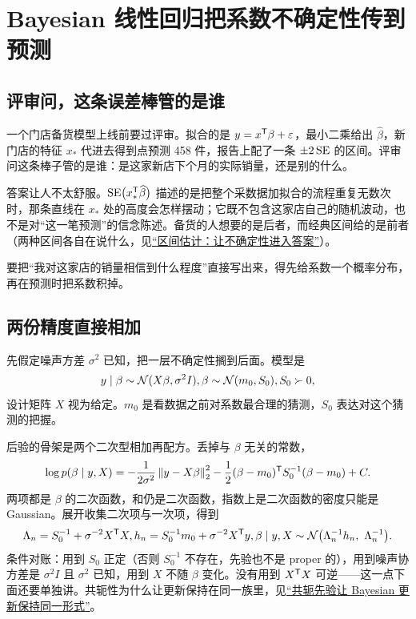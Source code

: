 \section{Bayesian 线性回归把系数不确定性传到预测}
\label{sec:13-Machine-Learning/02-Linear-Models/04}

\subsection{评审问，这条误差棒管的是谁}

一个门店备货模型上线前要过评审。拟合的是 \(y=x^{\mathsf{T}}\beta+\varepsilon\)，最小二乘给出 \(\widehat\beta\)，新门店的特征 \(x_*\) 代进去得到点预测 458 件，报告上配了一条 \(\pm 2\operatorname{SE}\) 的区间。评审问这条棒子管的是谁：是这家新店下个月的实际销量，还是别的什么。

答案让人不太舒服。\(\operatorname{SE}\bigl(x_*^{\mathsf{T}}\widehat\beta\bigr)\) 描述的是把整个采数据加拟合的流程重复无数次时，那条直线在 \(x_*\) 处的高度会怎样摆动；它既不包含这家店自己的随机波动，也不是对``这一笔预测''的信念陈述。备货的人想要的是后者，而经典区间给的是前者（两种区间各自在说什么，见\hyperref[ch:089]{``区间估计：让不确定性进入答案''}）。

要把``我对这家店的销量相信到什么程度''直接写出来，得先给系数一个概率分布，再在预测时把系数积掉。

\subsection{两份精度直接相加}

先假定噪声方差 \(\sigma^2\) 已知，把一层不确定性搁到后面。模型是
\[
y\mid\beta\sim\mathcal N(X\beta,\sigma^2I),
\space
\beta\sim\mathcal N(m_0,S_0),\space S_0\succ 0,
\]
设计矩阵 \(X\) 视为给定。\(m_0\) 是看数据之前对系数最合理的猜测，\(S_0\) 表达对这个猜测的把握。

后验的骨架是两个二次型相加再配方。丢掉与 \(\beta\) 无关的常数，
\[
\log p(\beta\mid y,X)=-\frac{1}{2\sigma^2}\left\lVert y-X\beta\right\rVert_2^2-\frac12(\beta-m_0)^{\mathsf{T}}S_0^{-1}(\beta-m_0)+C .
\]
两项都是 \(\beta\) 的二次函数，和仍是二次函数，指数上是二次函数的密度只能是 Gaussian。展开收集二次项与一次项，得到
\[
\Lambda_n=S_0^{-1}+\sigma^{-2}X^{\trans}X,\qquad
h_n=S_0^{-1}m_0+\sigma^{-2}X^{\trans}y,\qquad
\beta\given y,X\sim\mathcal N\bigl(\Lambda_n^{-1}h_n,\ \Lambda_n^{-1}\bigr).
\]
条件对账：用到 \(S_0\) 正定（否则 \(S_0^{-1}\) 不存在，先验也不是 proper 的），用到噪声协方差是 \(\sigma^2I\) 且 \(\sigma^2\) 已知，用到 \(X\) 不随 \(\beta\) 变化。没有用到 \(X^{\mathsf{T}}X\) 可逆——这一点下面还要单独讲。共轭性为什么让更新保持在同一族里，见\hyperref[sec:13-Machine-Learning/06-Probabilistic-Models/07]{``共轭先验让 Bayesian 更新保持同一形式''}。

